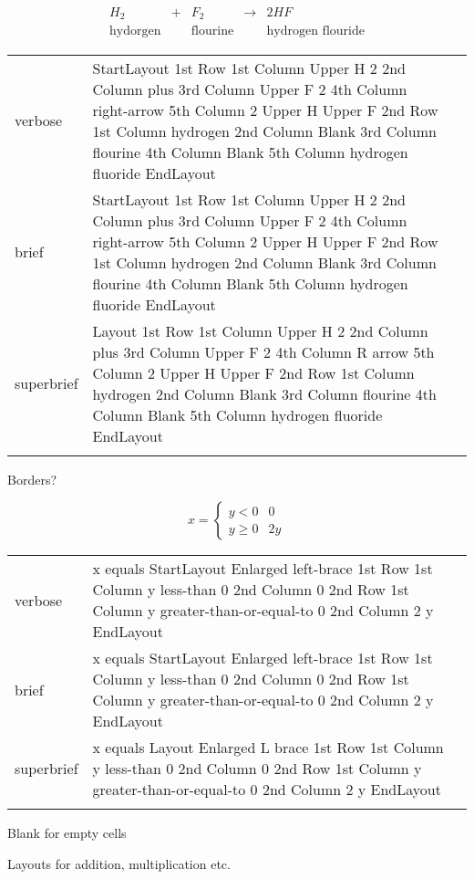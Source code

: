 
\label{sec:layouts}

\R
\E \[
\begin{array}{ccccc}
  H_2 & + & F_2 & \rightarrow & 2HF\\
  \text{hydorgen} & & \text{flourine} & & \text{hydrogen flouride}
\end{array}
\]

\begin{longtable}[c]{@{}lll@{}}
\toprule\addlinespace
verbose & StartLayout 1st Row 1st Column Upper H 2 2nd Column plus 3rd
Column Upper F 2 4th Column right-arrow 5th Column 2 Upper H Upper F 2nd
Row 1st Column hydrogen 2nd Column Blank 3rd Column flourine 4th Column
Blank 5th Column hydrogen fluoride EndLayout &

\\\addlinespace
brief & StartLayout 1st Row 1st Column Upper H 2 2nd Column plus 3rd
Column Upper F 2 4th Column right-arrow 5th Column 2 Upper H Upper F 2nd
Row 1st Column hydrogen 2nd Column Blank 3rd Column flourine 4th Column
Blank 5th Column hydrogen fluoride EndLayout &

\\\addlinespace
superbrief & Layout 1st Row 1st Column Upper H 2 2nd Column plus 3rd
Column Upper F 2 4th Column R arrow 5th Column 2 Upper H Upper F 2nd Row
1st Column hydrogen 2nd Column Blank 3rd Column flourine 4th Column
Blank 5th Column hydrogen fluoride EndLayout &

\\\addlinespace
\bottomrule
\end{longtable}

\R
Borders?

\R
\E \[x=\left\{
\begin{array}{cc}
    y<0 & 0\\
    y\geq 0 & 2y
  \end{array}
\right.\]

\begin{longtable}[c]{@{}lll@{}}
\toprule\addlinespace
verbose & x equals StartLayout Enlarged left-brace 1st Row 1st Column y
less-than 0 2nd Column 0 2nd Row 1st Column y greater-than-or-equal-to 0
2nd Column 2 y EndLayout &

\\\addlinespace
brief & x equals StartLayout Enlarged left-brace 1st Row 1st Column y
less-than 0 2nd Column 0 2nd Row 1st Column y greater-than-or-equal-to 0
2nd Column 2 y EndLayout &

\\\addlinespace
superbrief & x equals Layout Enlarged L brace 1st Row 1st Column y
less-than 0 2nd Column 0 2nd Row 1st Column y greater-than-or-equal-to 0
2nd Column 2 y EndLayout &

\\\addlinespace
\bottomrule
\end{longtable}

\R
Blank for empty cells

\R
Layouts for addition, multiplication etc.


